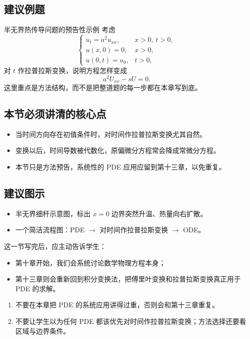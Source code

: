 \subsection*{建议例题}
\begin{lizi}{半无界热传导问题的预告性示例}{}
考虑
\[
    \begin{cases}
        u_t=a^2u_{xx}, & x>0,\ t>0,\\
        u(x,0)=0, & x>0,\\
        u(0,t)=u_0, & t>0,
    \end{cases}
\]
对 $t$ 作拉普拉斯变换，说明方程怎样变成
\[
    a^2U_{xx}-sU=0.
\]
这里重点是方法结构，而不是把整道题的每一步都在本章写到底。
\end{lizi}

\subsection*{本节必须讲清的核心点}
\begin{itemize}
    \item 当时间方向存在初值条件时，对时间作拉普拉斯变换尤其自然。
    \item 变换以后，时间导数被代数化，原偏微分方程常会降成常微分方程。
    \item 本节只是方法预告，系统性的 PDE 应用应留到第十三章，以免重复。
\end{itemize}

\subsection*{建议图示}
\begin{itemize}
    \item 半无界细杆示意图，标出 $x=0$ 边界突然升温、热量向右扩散。
    \item 一个简洁流程图：PDE $\to$ 对时间作拉普拉斯变换 $\to$ ODE。
\end{itemize}

\begin{tishi}[与后续章节的衔接]
这一节写完后，应主动告诉学生：
\begin{itemize}
    \item 第十章开始，我们会系统讨论数学物理方程本身；
    \item 第十三章则会重新回到积分变换法，把傅里叶变换和拉普拉斯变换真正用于 PDE 的求解。
\end{itemize}
\end{tishi}

\begin{jinshi}[本节易错点]
\begin{enumerate}
    \item 不要在本章把 PDE 的系统应用讲得过重，否则会和第十三章重复。
    \item 不要让学生以为任何 PDE 都该优先对时间作拉普拉斯变换；方法选择还要看区域与边界条件。
\end{enumerate}
\end{jinshi}

